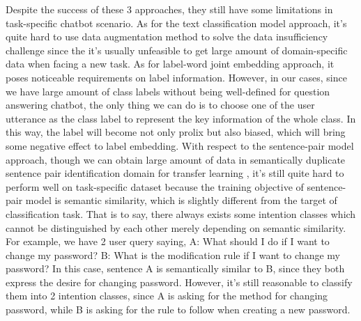 \documentclass[letterpaper]{article} %
\begin{document}
  Despite the success of these 3 approaches, they still have some limitations in
  task-specific chatbot scenario. As for the text classification model approach,
  it's   quite   hard  to  use  data  augmentation  method  to  solve  the  data
  insufficiency  challenge since the it's usually unfeasible to get large amount
  of  domain-specific  data  when  facing  a  new  task. As for label-word joint
  embedding  approach,  it  poses  noticeable requirements on label information.
  However,  in  our  cases,  since  we have large amount of class labels without
  being well-defined for question answering chatbot, the only thing we can do is
  to  choose  one  of the user utterance as the class label to represent the key
  information  of  the  whole class. In this way, the label will become not only
  prolix  but  also  biased,  which  will  bring  some  negative effect to label
  embedding.  With  respect  to  the sentence-pair model approach, though we can
  obtain   large   amount  of  data  in  semantically  duplicate  sentence  pair
  identification  domain  for  transfer  learning \cite{sun2019fine},  it's still
  quite  hard  to  perform  well  on  task-specific dataset because the training
  objective  of  sentence-pair  model  is semantic similarity, which is slightly
  different from the target of classification task. That is to say, there always
  exists  some intention classes which cannot be distinguished by each other merely
  depending on semantic similarity. For example, we have 2 user query saying, A:
  What  should I do if I want to change my password? B: What is the modification
  rule if I want to change my password? In this case, sentence A is semantically
  similar  to  B,  since  they  both  express  the desire for changing password.
  However, it's still reasonable to classify them into 2 intention classes, since A
  is asking for the method for changing password, while B is asking for the rule
  to follow when creating a new password.
\end{document}
